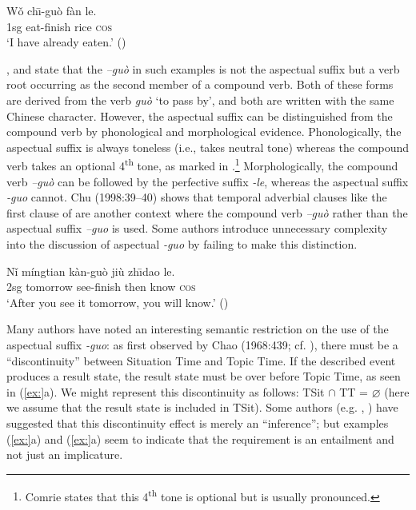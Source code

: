\ea
\gll Wǒ  ch\={\i}-guò  fàn  le.\\
1sg  eat-finish  rice  \textsc{cos}\\
\glt ‘I have already eaten.’  (\citealt{Ma1977})
\z


\citet[251]{Chao1968}, \citet[59]{Comrie1976} and \citet[139ff.]{XiaoMcEnery2004} state that the \textit{–guò} in such examples is not the aspectual suffix but a verb root occurring as the second member of a compound verb. Both of these forms are derived from the verb \textit{guò} ‘to pass by’, and both are written with the same Chinese character. However, the aspectual suffix can be distinguished from the compound verb by phonological and morphological evidence. Phonologically, the aspectual suffix is always toneless (i.e., takes neutral tone) whereas the compound verb takes an optional 4\textsuperscript{th} tone, as marked in .\footnote{Comrie states that this 4\textsuperscript{th} tone is optional but is usually pronounced.} Morphologically, the compound verb \textit{–guò} can be followed by the perfective suffix \textit{-le}, whereas the aspectual suffix \textit{-guo} cannot. Chu (1998:39–40) shows that temporal adverbial clauses like the first clause of  are another context where the compound verb \textit{–guò} rather than the aspectual suffix \textit{–guo} is used. Some authors introduce unnecessary complexity into the discussion of aspectual \textit{-guo} by failing to make this distinction.


\ea
\gll Nǐ  míngtian  kàn-guò  jiù  zh\={\i}dao  le.\\
2sg  tomorrow  see-finish  then  know  \textsc{cos}\\
\glt ‘After you see it tomorrow, you will know.’  (\citealt{Chen1979})
\z


Many authors have noted an interesting semantic restriction on the use of the aspectual suffix \textit{-guo}: as first observed by Chao (1968:439; cf. \citealt{Yeh1996}), there must be a “discontinuity” between Situation Time and Topic Time. If the described event produces a result state, the result state must be over before Topic Time, as seen in (\ref{ex:}a). We might represent this discontinuity as follows: TSit ${\cap}$ TT = ⌀ (here we assume that the result state is included in TSit). Some authors (e.g. \citealt{Iljic1990}, \citealt{Yeh1996}) have suggested that this discontinuity effect is merely an “inference”; but examples (\ref{ex:}a) and (\ref{ex:}a) seem to indicate that the requirement is an entailment and not just an implicature.


